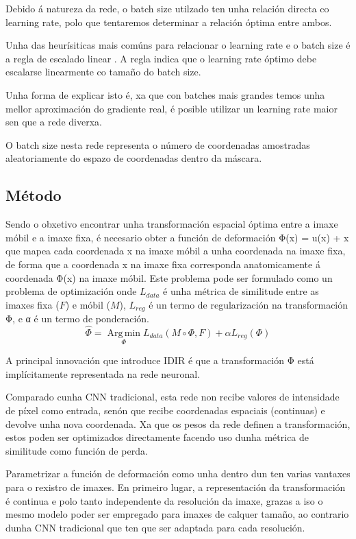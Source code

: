 Debido á natureza da rede, o batch size utilzado ten unha relación directa co learning rate, polo que tentaremos determinar a relación óptima entre ambos.

Unha das heurísiticas mais comúns para relacionar o learning rate e o batch size é a regla de escalado linear \cite{goyal2018accuratelargeminibatchsgd}. 
A regla indica que o learning rate óptimo debe escalarse linearmente co tamaño do batch size. 

Unha forma de explicar isto é, xa que con batches mais grandes temos unha mellor aproximación do gradiente real, é posible utilizar un learning rate maior sen que a rede diverxa. \cite{kexuefm}

O batch size nesta rede representa o número de coordenadas amostradas aleatoriamente do espazo de coordenadas dentro da máscara.

\subsection{Método}
\label{subsubsec:Método}

Sendo o obxetivo encontrar unha transformación espacial óptima entre a imaxe móbil e a imaxe fixa,
é necesario obter a función de deformación  Φ(x) = u(x) + x que mapea cada coordenada x na imaxe móbil a unha coordenada na imaxe fixa, 
de forma que a coordenada x na imaxe fixa corresponda anatomicamente á coordenada Φ(x) na imaxe móbil.
Este problema pode ser formulado como un problema de optimización onde $L_{data}$ é unha métrica de similitude entre as imaxes fixa ($F$) e móbil ($M$), $L_{reg}$ é un termo de regularización na transformación Φ, e α é un termo de ponderación.
\begin{equation}
    \hat{\Phi} = \operatorname*{Arg\,min}_{\Phi} L_{data}(M \circ \Phi, F) + \alpha L_{reg}(\Phi)
\end{equation}


A principal innovación que introduce IDIR\cite{wolterink2021implicit} é que a transformación Φ está implícitamente representada na rede neuronal.

Comparado cunha CNN tradicional, esta rede non recibe valores de intensidade de píxel como entrada,
senón que recibe coordenadas espaciais (continuas) e devolve unha nova coordenada.
Xa que os pesos da rede definen a transformación, estos poden ser optimizados directamente 
facendo uso dunha métrica de similitude como función de perda.

Parametrizar a función de deformación como unha  dentro dun  ten varias vantaxes para o rexistro de imaxes.
En primeiro lugar, a representación da transformación é continua e polo tanto independente da resolución da imaxe, 
grazas a iso o mesmo modelo poder ser empregado para imaxes de calquer tamaño, ao contrario dunha CNN tradicional 
que ten que ser adaptada para cada resolución.

